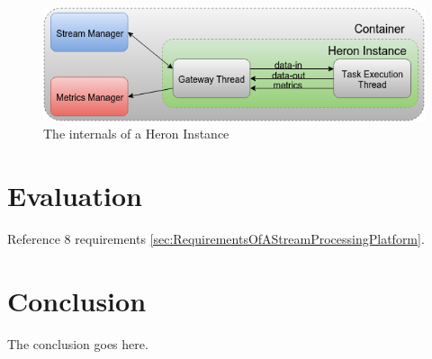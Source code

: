 \documentclass[conference]{IEEEtran}
\begin{document}
\begin{figure}[htp]
    \centering
    \includegraphics[scale=0.45]{figures/HeronInstance}
    \caption{The internals of a Heron Instance}
    \label{fig:HeronInstance}
\end{figure}

\cite{ElasticScalingStreamProcessing}
\cite{OnlyOneLook}
\cite{YARN}
\cite{ScalableDistributedStreamProcessing}



\section{Evaluation}
\label{sec:Evaluation}

\lipsum[2-4]


\cite{TwitterHeronBlog}

\cite{TwitterHeron}

Reference 8 requirements \ref{sec:RequirementsOfAStreamProcessingPlatform}.


\section{Conclusion}
\label{sec:Conclusion}

The conclusion goes here.

\lipsum[2-4]





\end{document}
